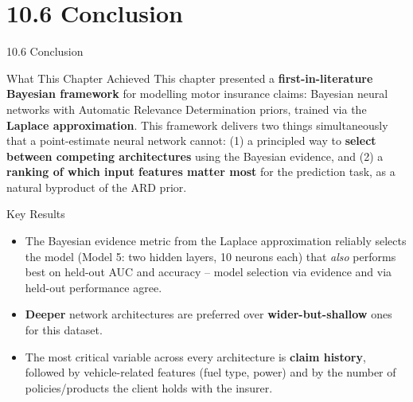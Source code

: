 \documentclass[aspectratio=169,10pt]{beamer}
\begin{document}
\section{10.6 Conclusion}

\begin{frame}[allowframebreaks]{10.6 Conclusion}

  \begin{block}{What This Chapter Achieved}
    This chapter presented a \textbf{first-in-literature Bayesian framework}
    for modelling motor insurance claims: Bayesian neural networks with
    Automatic Relevance Determination priors, trained via the \textbf{Laplace
    approximation}. This framework delivers two things simultaneously that a
    point-estimate neural network cannot: (1) a principled way to
    \textbf{select between competing architectures} using the Bayesian
    evidence, and (2) a \textbf{ranking of which input features matter most}
    for the prediction task, as a natural byproduct of the ARD prior.
  \end{block}

  \begin{block}{Key Results}
    \begin{itemize}
      \item The Bayesian evidence metric from the Laplace approximation
        reliably selects the model (Model 5: two hidden layers, 10 neurons
        each) that \emph{also} performs best on held-out AUC and accuracy --
        model selection via evidence and via held-out performance agree.
      \item \textbf{Deeper} network architectures are preferred over
        \textbf{wider-but-shallow} ones for this dataset.
      \item The most critical variable across every architecture is
        \textbf{claim history}, followed by vehicle-related features (fuel
        type, power) and by the number of policies/products the client holds
        with the insurer.
    \end{itemize}
  \end{block}

  \framebreak


\end{frame}
\end{document}
